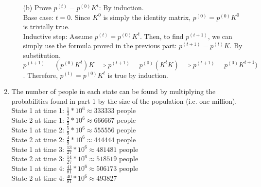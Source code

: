 \documentclass{article}
\begin{document}
\begin{enumerate}
\begin{itemize}
              \item [(b)] Prove $p^{(t)}=p^{(0)}K^t$: By induction.\\
                    Base case: $t=0$. Since $K^0$ is simply the identity matrix, $p^{(0)}=p^{(0)}K^0$ is trivially true.\\
                    Inductive step: Assume $p^{(t)}=p^{(0)}K^t$. Then, to find $p^{(t+1)}$, we can simply use the formula proved in the previous part: $p^{(t+1)}=p^{(t)}K$. By substitution, $p^{(t+1)}=(p^{(0)}K^t)K \implies p^{(t+1)}=p^{(0)}(K^tK) \implies p^{(t+1)}=p^{(0)}K^{t+1})$. Therefore, $p^{(t)}=p^{(0)}K^t$ is true by induction.
          \end{itemize}
    \item The number of people in each state can be found by multiplying the probabilities found in part 1 by the size of the population (i.e. one million).\\
    State 1 at time 1: $\frac{1}{3}*10^6\approx 333333$ people\\
    State 2 at time 1: $\frac{2}{3}*10^6\approx 666667$ people\\
    State 1 at time 2: $\frac{5}{9}*10^6\approx 555556$ people\\
    State 2 at time 2: $\frac{4}{9}*10^6\approx 444444$ people\\
    State 1 at time 3: $\frac{13}{27}*10^6\approx 481481$ people\\
    State 2 at time 3: $\frac{14}{27}*10^6\approx 518519$ people\\
    State 1 at time 4: $\frac{41}{81}*10^6\approx 506173$ people\\
    State 2 at time 4: $\frac{40}{81}*10^6\approx 493827$
\end{enumerate}
\end{document}
